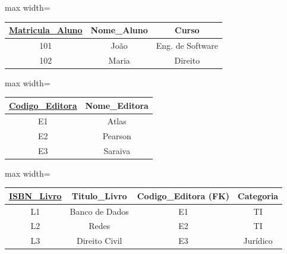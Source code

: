 \vspace{0.4cm}

\centering

\begin{adjustbox}{max width=\textwidth}
\begin{tabular}{|c|c|c|}
\hline
\textbf{\underline{Matricula\_Aluno}} & Nome\_Aluno & Curso \\ \hline
101 & João & Eng. de Software \\ \hline
102 & Maria & Direito \\ \hline
\end{tabular}
\end{adjustbox}

\vspace{0.3cm}

\vspace{0.5cm}

\begin{adjustbox}{max width=\textwidth}
\begin{tabular}{|c|c|}
\hline
\textbf{\underline{Codigo\_Editora}} & Nome\_Editora \\ \hline
E1 & Atlas \\ \hline
E2 & Pearson \\ \hline
E3 & Saraiva \\ \hline
\end{tabular}
\end{adjustbox}

\vspace{0.3cm}

\vspace{0.5cm}

\begin{adjustbox}{max width=\textwidth}
\begin{tabular}{|c|c|c|c|}
\hline
\textbf{\underline{ISBN\_Livro}} & Titulo\_Livro & Codigo\_Editora (FK) & Categoria \\ \hline
L1 & Banco de Dados & E1 & TI \\ \hline
L2 & Redes & E2 & TI \\ \hline
L3 & Direito Civil & E3 & Jurídico \\ \hline
\end{tabular}
\end{adjustbox}

\vspace{0.3cm}

\vspace{0.5cm}

